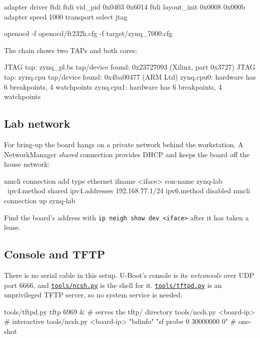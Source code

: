 \documentclass[11pt,a4paper,oneside]{article}
\newcommand{\cmd}[1]{\texttt{#1}}
\newcommand{\repo}{https://github.com/MaxClerkwell/ax7020-bringup}
\newcommand{\rfile}[1]{\href{\repo/blob/master/#1}{\color{bluemid}\nolinkurl{#1}}}
\begin{document}
\begin{code}
adapter driver ftdi
ftdi vid_pid 0x0403 0x6014
ftdi layout_init 0x0008 0x000b
adapter speed 1000
transport select jtag
\end{code}

\begin{shell}
openocd -f openocd/ft232h.cfg -f target/zynq_7000.cfg
\end{shell}

\begin{checkpoint}
The chain shows two TAPs and both cores:
\begin{code}
JTAG tap: zynq_pl.bs tap/device found: 0x23727093 (Xilinx, part 0x3727)
JTAG tap: zynq.cpu   tap/device found: 0x4ba00477 (ARM Ltd)
zynq.cpu0: hardware has 6 breakpoints, 4 watchpoints
zynq.cpu1: hardware has 6 breakpoints, 4 watchpoints
\end{code}
\end{checkpoint}

\subsection{Lab network}

For bring-up the board hangs on a private network behind the workstation.
A NetworkManager \emph{shared} connection provides DHCP and keeps the board
off the house network:

\begin{shell}
nmcli connection add type ethernet ifname <iface> con-name zynq-lab \
    ipv4.method shared ipv4.addresses 192.168.77.1/24 ipv6.method disabled
nmcli connection up zynq-lab
\end{shell}

Find the board's address with \cmd{ip neigh show dev <iface>} after it has
taken a lease.

\subsection{Console and TFTP}

There is no serial cable in this setup. U-Boot's console is its
\emph{netconsole} over UDP port 6666, and \rfile{tools/ncsh.py} is the shell
for it. \rfile{tools/tftpd.py} is an unprivileged TFTP server, so no system
service is needed:

\begin{shell}
tools/tftpd.py tftp 6969 &                  # serves the tftp/ directory
tools/ncsh.py <board-ip>                    # interactive
tools/ncsh.py <board-ip> "bdinfo" "sf probe 0 30000000 0"   # one-shot
\end{shell}
\end{document}
